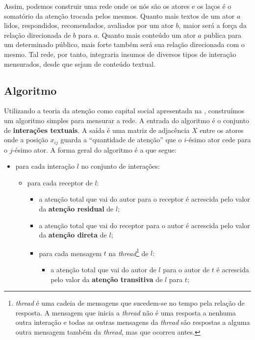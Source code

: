 Assim, podemos construir uma rede onde os nós são os atores e os laços é o
somatório da atenção trocada pelos mesmos. Quanto mais textos de um ator $a$
lidos, respondidos, recomendados, avaliados por um ator $b$, maior será a força
da relação direcionada de $b$ para $a$. Quanto mais conteúdo um ator $a$ publica
para um determinado público, mais forte também será sua relação direcionada
com o mesmo. Tal rede, por tanto, integraria insumos de diversos tipos de
interação mensurados, desde que sejam de conteúdo textual.

\subsection{Algoritmo}
\label{sec:formalizacao}

Utilizando a teoria da atenção como capital social apresentada na
, construímos um algoritmo simples para mensurar a
rede. A entrada do algoritmo é o conjunto de \textbf{interações textuais}. A
saída é uma matriz de adjacência $X$ entre os atores onde a posição $x_{ij}$
guarda a ``quantidade de atenção'' que o $i$-ésimo ator cede para o $j$-ésimo
ator. A forma geral do algoritmo é a que segue:

\begin{itemize}
  \item para cada interação $l$ no conjunto de interações: \begin{itemize}
    \item para cada receptor de $l$: \begin{itemize}
      \item a atenção total que vai do autor para o receptor é acrescida pelo
      valor da \textbf{atenção residual} de $l$;
      \item a atenção total que vai do receptor para o autor é acrescida pelo valor da
		\textbf{atenção direta} de $l$;
	  \item	para cada mensagem $t$ na \emph{thread}\footnote{\emph{thread} é uma
	  cadeia de mensagens que sucedem-se no tempo pela relação de resposta. A
	  mensagem que inicia a \emph{thread} não é uma resposta a nenhuma outra
	  interação e todas as outras mensagens da \emph{thread} são respostas a alguma outra mensagem
	  também da \emph{thread}, mas que ocorreu antes.} de $l$:
	  \begin{itemize}
	    \item a atenção total que vai do autor de $l$ para o autor de $t$ é
			acrescida pelo valor da \textbf{atenção transitiva} de $l$ para $t$;
		\end{itemize}
	\end{itemize}
\end{itemize}	
\end{itemize}
		 
